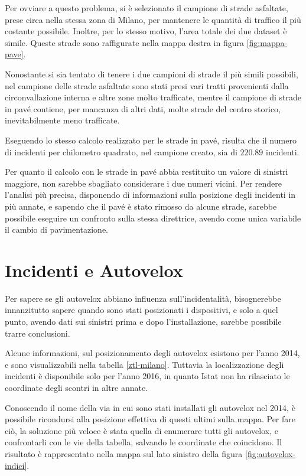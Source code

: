\documentclass[a4paper,12pt]{report}
\begin{document}
Per ovviare a questo problema, si è selezionato il campione di strade asfaltate, 
prese circa nella stessa zona di Milano, per mantenere le quantità di traffico il più 
costante possibile. 
Inoltre, per lo stesso motivo, l'area totale dei due dataset è simile.
Queste strade sono raffigurate nella mappa destra in figura \ref{fig:mappa-pave}. 

Nonostante si sia tentato di tenere i due campioni di strade il più simili 
possibili, nel campione delle strade asfaltate sono stati presi vari tratti 
provenienti dalla circonvallazione interna e altre zone molto trafficate, 
mentre il campione di strade in pavé 
contiene, per mancanza di altri dati, molte strade del centro storico, inevitabilmente 
meno trafficate.

Eseguendo lo stesso calcolo realizzato per le strade in pavé, risulta che 
il numero di incidenti per 
chilometro quadrato, nel campione creato, sia di $220.89$ incidenti.

Per quanto il calcolo con le strade in pavé abbia restituito un valore di 
sinistri maggiore, non sarebbe sbagliato considerare i due numeri vicini. 
Per rendere l'analisi più precisa, disponendo di informazioni sulla 
posizione degli incidenti in più annate, e sapendo che il pavé è stato 
rimosso da alcune strade, sarebbe possibile eseguire un confronto 
sulla stessa direttrice, avendo come unica variabile il cambio di pavimentazione.

\section{Incidenti e Autovelox}

Per sapere se gli autovelox abbiano influenza sull'incidentalità, 
bisognerebbe innanzitutto sapere quando sono stati posizionati i dispositivi, e solo 
a quel punto, avendo dati sui sinistri prima e dopo l'installazione, sarebbe 
possibile trarre conclusioni.

Alcune informazioni, sul posizionamento degli autovelox esistono per 
l'anno 2014, e sono visualizzabili 
nella tabella \ref{ztl-milano}. 
Tuttavia la localizzazione degli incidenti 
è disponibile solo per l'anno 2016, in quanto Istat non ha rilasciato 
le coordinate degli scontri in altre annate.

Conoscendo il nome della via in cui sono stati installati gli autovelox nel 2014, 
è possibile ricondursi alla posizione effettiva di questi ultimi sulla mappa.
Per fare ciò, la soluzione più veloce è stata quella di enumerare tutti gli autovelox, 
e confrontarli con le vie della tabella, salvando le coordinate che coincidono.
Il risultato è rappresentato nella mappa sul lato sinistro della 
figura \ref{fig:autovelox-indici}.
\end{document}
